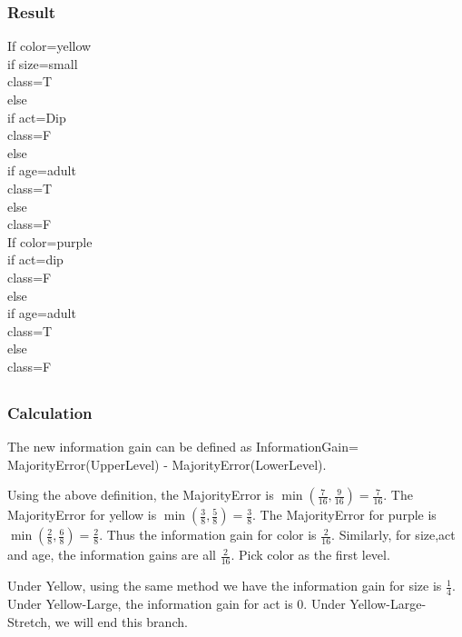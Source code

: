 \subsubsection{Result}
If color=yellow
\\ \indent if size=small
\\ \indent \indent class=T
\\ \indent else 
\\ \indent \indent if act=Dip
\\ \indent \indent \indent class=F
\\ \indent \indent else 
\\ \indent \indent \indent if age=adult
\\ \indent \indent \indent \indent class=T
\\ \indent \indent \indent else
\\ \indent \indent \indent \indent class=F  
\\ \noindent If color=purple
\\ \indent if act=dip
\\ \indent \indent class=F
\\ \indent else 
\\ \indent \indent if age=adult
\\ \indent \indent \indent class=T
\\ \indent \indent else 
\\ \indent \indent \indent class=F  
\subsection{}
\subsubsection{Calculation}
\noindent The new information gain can be defined as InformationGain= MajorityError(UpperLevel) - MajorityError(LowerLevel). 

\noindent Using the above definition, the MajorityError is $\min(\frac{7}{16},\frac{9}{16})=\frac{7}{16}$. The MajorityError for yellow is $\min(\frac{3}{8},\frac{5}{8})=\frac{3}{8}$. The MajorityError for purple is $\min(\frac{2}{8},\frac{6}{8})=\frac{2}{8}$. Thus the information gain for color is $\frac{2}{16}$. Similarly, for size,act and age, the information gains are all $\frac{2}{16}$. Pick color as the first level.

\noindent  
Under Yellow, using the same method we have the information gain for size is $\frac{1}{4}$. Under Yellow-Large, the information gain for act is 0. Under Yellow-Large-Stretch, we will end this branch. 

